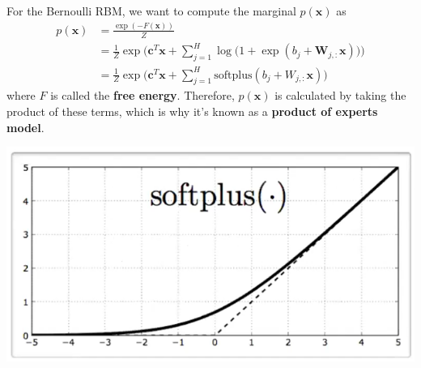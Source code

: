     \begin{lemma} 
      For the Bernoulli RBM, we want to compute the marginal $p(\mathbf{x})$ as
      \begin{align*} 
      p(\mathbf{x}) & = \frac{\exp(-F(\mathbf{x}))}{Z} \\
                    & = \frac{1}{Z} \exp \bigg( \mathbf{c}^T \mathbf{x} + \sum_{j=1}^H \log \big( 1 + \exp (b_j + \mathbf{W}_{j, :} \mathbf{x}) \big) \bigg) \\
                    & = \frac{1}{Z} \exp \bigg( \mathbf{c}^T \mathbf{x} + \sum_{j=1}^H \mathrm{softplus}(b_j + W_{j, :} \mathbf{x} ) \bigg)
      \end{align*}
      where $F$ is called the \textbf{free energy}. Therefore, $p(\mathbf{x})$ is calculated by taking the product of these terms, which is why it's known as a \textbf{product of experts model}. 
      \begin{center}
      \includegraphics[scale=0.4]{img/07_Boltzmann/softplus.png} 
      \end{center}
    \end{lemma}
